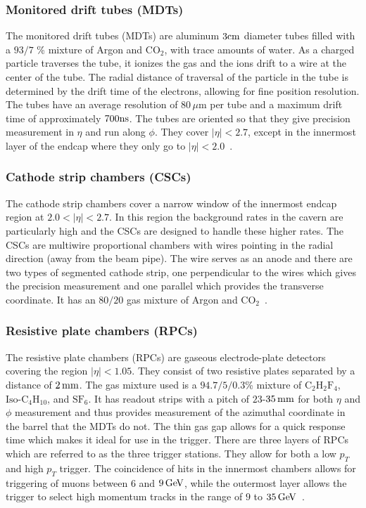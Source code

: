 \subsubsection{Monitored drift tubes (MDTs)}

The monitored drift tubes (MDTs) are aluminum $3 \rm cm$ diameter tubes filled with a $93/7$ \% mixture of Argon and $\textrm{CO}_2$, with trace amounts of water. As a charged particle traverses the tube, it ionizes the gas and the ions drift to a wire at the center of the tube. The radial distance of traversal of the particle in the tube is determined by the drift time of the electrons, allowing for fine position resolution. The tubes have an average resolution of $80\,\mu\textrm{m}$ per tube and a maximum drift time of approximately $700 \rm ns$. The tubes are oriented so that they give precision measurement in $\eta$ and run along $\phi$. They cover $|\eta| < 2.7$, except in the innermost layer of the endcap where they only go to $|\eta| < 2.0$~\cite{ATLASPaper}.

\subsubsection{Cathode strip chambers (CSCs)}

The cathode strip chambers cover a narrow window of the innermost endcap region at $2.0 < |\eta|< 2.7$. In this region the background rates in the cavern are particularly high and the CSCs are designed to handle these higher rates. The CSCs are multiwire proportional chambers with wires pointing in the radial direction (away from the beam pipe). The wire serves as an anode and there are two types of segmented cathode strip, one perpendicular to the wires which gives the precision measurement and one parallel which provides the transverse coordinate. It has an $80/20$ gas mixture of Argon and $\textrm{CO}_2$~\cite{ATLASPaper}. 

\subsubsection{Resistive plate chambers (RPCs)}

The resistive plate chambers (RPCs) are gaseous electrode-plate detectors covering the region $|\eta| < 1.05$. They consist of two resistive plates separated by a distance of $2\,\rm mm$. The gas mixture used is a $94.7/5/0.3$\% mixture of $\textrm{C}_2\textrm{H}_2\textrm{F}_4$, $\textrm{Iso-C}_4\textrm{H}_10$, and $\textrm{SF}_6$. It has readout strips with a pitch of $23$-$35\, \rm mm$ for both $\eta$ and $\phi$ measurement and thus provides measurement of the azimuthal coordinate in the barrel that the MDTs do not. The thin gas gap allows for a quick response time which makes it ideal for use in the trigger. There are three layers of RPCs which are referred to as the three trigger stations. They allow for both a low $p_{T}$ and high $p_{T}$ trigger. The coincidence of hits in the innermost chambers allows for triggering of muons between $6$ and $9 \GeV$, while the outermost layer allows the trigger to select high momentum tracks in the range of $9$ to $35\GeV$~\cite{ATLASPaper}.

